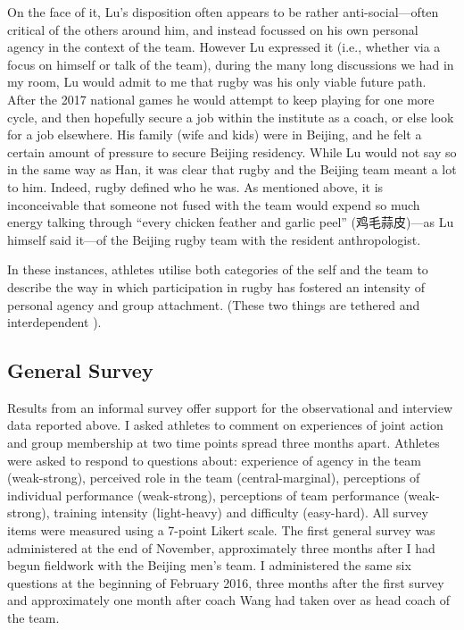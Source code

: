 \begin{CJK}{UTF8}{gbsn}
On the face of it, Lu's disposition often appears to be rather anti-social---often critical of the others around him, and instead focussed on his own personal agency in the context of the team.  However Lu expressed it (i.e., whether via a focus on himself or talk of the team), during the many long discussions we had in my room, Lu would admit to me that rugby was his only viable future path.  After the 2017 national games he would attempt to keep playing for one more cycle, and then hopefully secure a job within the institute as a coach, or else look for a job elsewhere.  His family (wife and kids) were in Beijing, and he felt a certain amount of pressure to secure Beijing residency.  While Lu would not say so in the same way as Han, it was clear that rugby and the Beijing team meant a lot to him. Indeed, rugby defined who he was.  As mentioned above, it is inconceivable that someone not fused with the team would expend so much energy talking through ``every chicken feather and garlic peel'' (鸡毛蒜皮)---as Lu himself said it---of the Beijing rugby team with the resident anthropologist.


In these instances, athletes utilise both categories of the self and the team to describe the way in which participation in rugby has fostered an intensity of personal agency and group attachment.  (These two things are tethered and interdependent \citep{Kelso2016}).







\clearpage



\subsection{General Survey}

Results from an informal survey offer support for the observational and interview data reported above. I asked athletes to comment on experiences of joint action and group membership at two time points spread three months apart.  Athletes were asked to respond to questions about: experience of agency in the team (weak-strong), perceived role in the team (central-marginal), perceptions of individual performance (weak-strong), perceptions of team performance (weak-strong), training intensity (light-heavy) and difficulty (easy-hard).  All survey items were measured using a 7-point Likert scale.  The first general survey was administered at the end of November, approximately three months after I had begun fieldwork with the Beijing men's team.  I administered the same six questions at the beginning of February 2016, three months after the first survey and approximately one month after coach Wang had taken over as head coach of the team.


\end{CJK}

